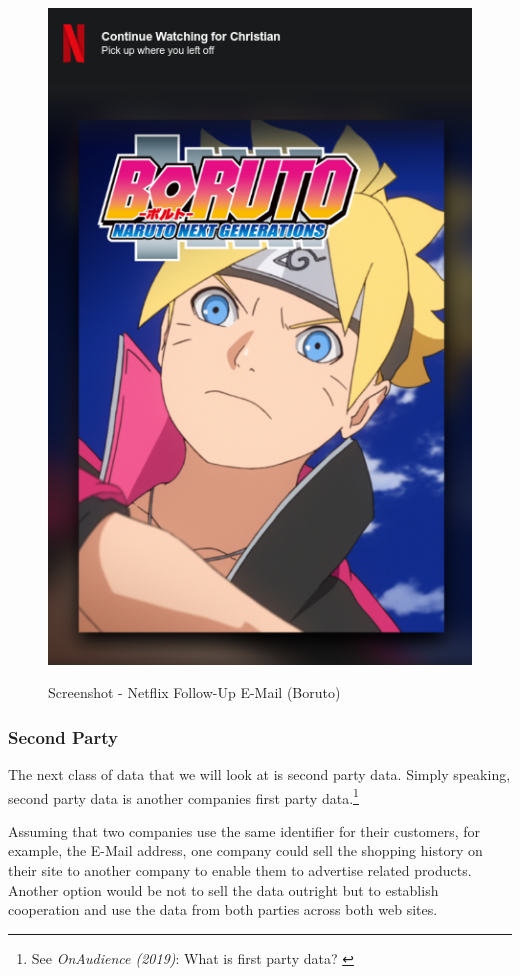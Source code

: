 \begin{figure}[H]
\centering
\caption {Screenshot - Netflix Follow-Up E-Mail (Boruto)}
\includegraphics[scale=0.6]{images/continue-boruto.png}
\label{fig:boruto}
\end{figure}

\subsubsection{Second Party}

The next class of data that we will look at is second party data. Simply speaking, second party data is another companies first party data.\footnote{See \textit{OnAudience (2019)}: What is first party data? \cite{firstParty}}

Assuming that two companies use the same identifier for their customers, for example, the E-Mail address, one company could sell the shopping history on their site to another company to enable them to advertise related products. Another option would be not to sell the data outright but to establish cooperation and use the data from both parties across both web sites.

